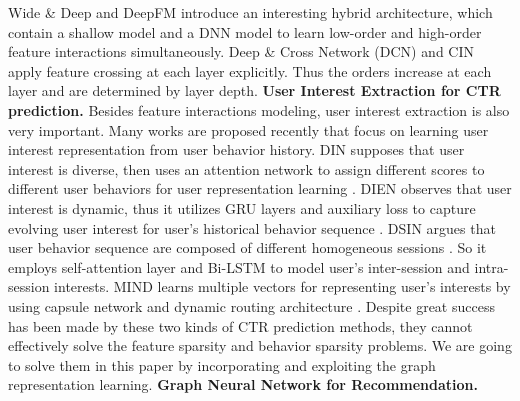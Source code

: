 Wide \& Deep \cite{cheng2016wide} and DeepFM \cite{guo2017deepfm} introduce an interesting hybrid architecture, which contain a shallow model and a DNN model to learn low-order and high-order feature interactions simultaneously.
Deep \& Cross Network (DCN) \cite{wang2017deep} and  CIN \cite{lian2018xdeepfm} apply feature crossing at each layer explicitly. Thus the orders increase at each layer and are determined by layer depth.
\newline
\textbf{User Interest Extraction for CTR prediction.}
Besides feature interactions modeling, user interest extraction is also very important.
Many works are proposed recently that focus on learning user interest representation from user behavior history.
DIN supposes that user interest is diverse, then uses an attention network to assign different scores to different user behaviors for user representation learning \cite{zhou2018deep}.
DIEN observes that user interest is dynamic, thus it utilizes GRU layers and auxiliary loss to capture evolving user interest for user's historical behavior sequence \cite{zhou2019deep}.
DSIN argues that user behavior sequence are composed of different homogeneous sessions \cite{feng2019deep}.
So it employs self-attention layer and Bi-LSTM to model user's inter-session and intra-session interests.
MIND learns multiple vectors for representing user's interests by using capsule network and dynamic routing architecture \cite{li2019multi}.
Despite great success has been made by these two kinds of CTR prediction methods, they cannot effectively solve the feature sparsity and behavior sparsity problems.
We are going to solve them in this paper by incorporating and exploiting the graph representation learning.
\newline
\textbf{Graph Neural Network for Recommendation.}
